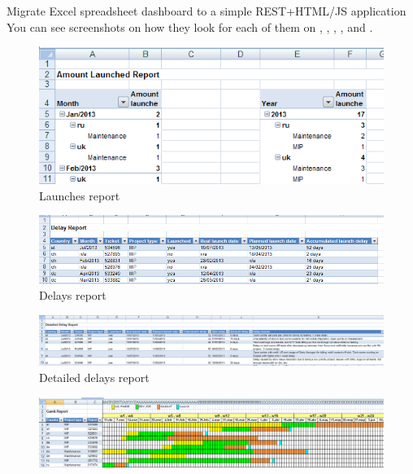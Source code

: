 \begin{part}{Migrate Excel spreadsheet dashboard to a simple REST+HTML/JS
application}
You can see screenshots on how they look for each of them on
, ,
, ,
 and .

\begin{figure}[ht!]
	\centering
   	\includegraphics[width=1\textwidth]{./resources/report_launches.png}
   	\caption{Launches report}
   	\label{f_report_launches}
\end{figure}
\begin{figure}[ht!]
	\centering
   	\includegraphics[width=1\textwidth]{./resources/report_delays.png}
   	\caption{Delays report}
   	\label{f_report_delays}
\end{figure}
\begin{figure}[ht!]
	\centering
   	\includegraphics[width=1\textwidth]{./resources/report_delays_detail.png}
   	\caption{Detailed delays report}
   	\label{f_report_delays_detail}
\end{figure}
\begin{figure}[ht!]
	\centering
   	\includegraphics[width=1\textwidth]{./resources/report_gantt.png}

\end{figure}
\end{part}
